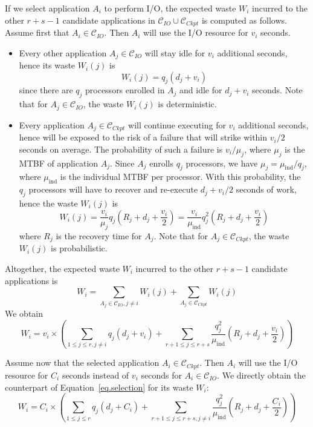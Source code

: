 \documentclass[conference]{IEEEtran}
\newcommand{\muind}{\mu_{\text{ind}}}
\newcommand{\wap}[1]{W_{#1}}
\newcommand{\wapp}[2]{W_{#1}(#2)}
\newcommand{\Catiocat}{\mathcal{C}_{IO}\xspace}
\newcommand{\Catckptcat}{\mathcal{C}_{Ckpt}\xspace}
\begin{document}
If we select application $A_{i}$ to perform I/O,  the expected waste $\wap{i}$ incurred
to the other $r+s-1$ candidate applications in  $\Catiocat \cup \Catckptcat$ is computed as follows.
Assume first that $A_{i} \in \Catiocat$. Then  $A_{i}$ will use the I/O resource for $v_{i}$ seconds.
\begin{itemize}
  \item Every other application $A_{j} \in \Catiocat$ will stay idle for $v_{i}$ additional seconds,
  hence its waste $\wapp{i}{j}$ is
  $$\wapp{i}{j} = q_{j} (d_{j} + v_{i})$$
  since there are $q_{j}$ processors enrolled in $A_{j}$ and idle for $d_{j} + v_{i}$ seconds. Note that for $A_{j} \in \Catiocat$, the waste $\wapp{i}{j}$ is deterministic.
  \item Every application $A_{j} \in \Catckptcat$ will continue executing for $v_{i}$ additional seconds, hence will be exposed to the risk of a failure that will strike within $v_{i}/2$ seconds on average. The probability of such a failure is $v_{i}/\mu_{j}$, where $\mu_{j}$ is the
  MTBF of application $A_{j}$. Since $A_{j}$ enrolls $q_{j}$ processors, we have $\mu_{j} = \muind/q_{j}$, where $\muind$ is the individual MTBF per processor. With this probability,
  the $q_{j}$ processors will have to recover and re-execute $d_{j} + v_{i}/2$ seconds of work,
  hence the waste $\wapp{i}{j}$ is
     $$\wapp{i}{j} = \frac{v_{i}}{\mu_{j} } q_{j} (R_{j} + d_{j} + \frac{v_{i}}{2}) =
     \frac{v_{i}}{\muind} q^{2}_{j} (R_{j} + d_{j} + \frac{v_{i}}{2})$$
     where $R_{j}$ is the recovery time for $A_{j}$.
Note that for $A_{j} \in \Catckptcat$, the waste $\wapp{i}{j}$ is probabilistic.
 \end{itemize}
 Altogether, the expected waste $\wap{i}$ incurred
to the other $r+s-1$ candidate applications is
$$\wap{i} = \sum_{A_{j} \in \Catiocat, j\neq i} \wapp{i}{j} + \sum_{A_{j} \in \Catckptcat} \wapp{i}{j}$$
We obtain
\begin{equation}
\label{eq.selection}
 \wap{i} = v_{i} \times \left( \sum_{1 \leq j \leq r, j\neq i} q_{j} (d_{j} + v_{i})
 + \sum_{r+1 \leq j \leq r+s}   \frac{q^{2}_{j}}{\muind} (R_{j} + d_{j} + \frac{v_{i}}{2}) \right)
\end{equation}

 Assume now that the selected application $A_{i} \in \Catckptcat$. Then  $A_{i}$ will use the I/O resource for $C_{i}$ seconds instead of $v_{i}$ seconds for $A_{i} \in \Catiocat$. We directly obtain the counterpart of Equation~\eqref{eq.selection} for its waste $\wap{i}$:
 \begin{equation}
\label{eq.selection2}
 \wap{i} = C_{i} \times \left( \sum_{1 \leq j \leq r} q_{j} (d_{j} + C_{i})
 + \sum_{r+1 \leq j \leq r+s, j\neq i}   \frac{q^{2}_{j}}{\muind} (R_{j} + d_{j} + \frac{C_{i}}{2}) \right)
\end{equation}
\end{document}
